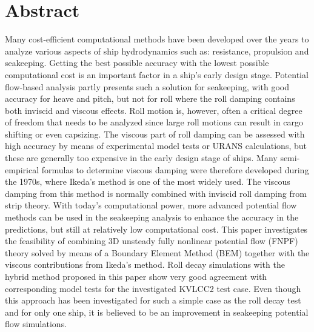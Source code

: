 \section{Abstract}\label{abstract}

Many cost-efficient computational methods have been developed over the
years to analyze various aspects of ship hydrodynamics such as:
resistance, propulsion and seakeeping. Getting the best possible
accuracy with the lowest possible computational cost is an important
factor in a ship's early design stage. Potential flow-based analysis
partly presents such a solution for seakeeping, with good accuracy for
heave and pitch, but not for roll where the roll damping contains both
inviscid and viscous effects. Roll motion is, however, often a critical
degree of freedom that needs to be analyzed since large roll motions can
result in cargo shifting or even capsizing. The viscous part of roll
damping can be assessed with high accuracy by means of experimental
model tests or URANS calculations, but these are generally too expensive
in the early design stage of ships. Many semi-empirical formulas to
determine viscous damping were therefore developed during the 1970s,
where Ikeda's method is one of the most widely used. The viscous damping
from this method is normally combined with inviscid roll damping from
strip theory. With today's computational power, more advanced potential
flow methods can be used in the seakeeping analysis to enhance the
accuracy in the predictions, but still at relatively low computational
cost. This paper investigates the feasibility of combining 3D unsteady
fully nonlinear potential flow (FNPF) theory solved by means of a
Boundary Element Method (BEM) together with the viscous contributions
from Ikeda's method. Roll decay simulations with the hybrid method
proposed in this paper show very good agreement with corresponding model
tests for the investigated KVLCC2 test case. Even though this approach
has been investigated for such a simple case as the roll decay test and
for only one ship, it is believed to be an improvement in seakeeping
potential flow simulations.

    